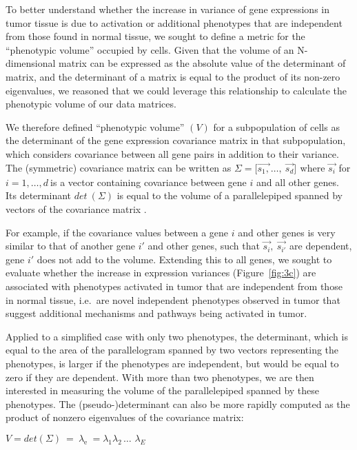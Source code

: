 To better understand whether the increase in variance of gene expressions in tumor tissue is due to activation or additional phenotypes that are independent from those found in normal tissue, we sought to define a metric for the ``phenotypic volume'' occupied by cells.
Given that the volume of an N-dimensional matrix can be expressed as the absolute value of the determinant of matrix, and the determinant of a matrix is equal to the product of its non-zero eigenvalues, we reasoned that we could leverage this relationship to calculate the phenotypic volume of our data matrices. %

We therefore defined ``phenotypic volume'' \((V)\) for a subpopulation of cells as the determinant of the gene expression covariance matrix in that subpopulation, which considers covariance between all gene pairs in addition to their variance.
The (symmetric) covariance matrix can be written as \(\Sigma = \lbrack{\overrightarrow{s_{1},}}_{}\ldots,\ \overrightarrow{s_{d}}\rbrack^{}\) where \(\overrightarrow{s_{i}}\) for \(i = 1,\ldots,d\ \)is a vector containing covariance between gene \(i\) and all other genes.
Its determinant \(det\ (\Sigma)\) is equal to the volume of a parallelepiped spanned by vectors of the covariance matrix \citep{Tao2005}.

For example, if the covariance values between a gene \(i\) and other genes is very similar to that of another gene \(i'\) and other genes, such that \(\overrightarrow{s_{i}},\ \overrightarrow{s_{i'}}\) are dependent, gene \(i'\) does not add to the volume.
Extending this to all genes, we sought to evaluate whether the increase in expression variances (Figure~\ref{fig:3c}) are associated with phenotypes activated in tumor that are independent from those in normal tissue, i.e.\ are novel independent phenotypes observed in tumor that suggest additional mechanisms and pathways being activated in tumor.

Applied to a simplified case with only two phenotypes, the determinant, which is equal to the area of the parallelogram spanned by two vectors representing the phenotypes, is larger if the phenotypes are independent, but would be equal to zero if they are dependent.
With more than two phenotypes, we are then interested in measuring the volume of the parallelepiped spanned by these phenotypes.
The (pseudo-)determinant can also be more rapidly computed as the product of nonzero eigenvalues of the covariance matrix:

\(V = det(\Sigma)\  = \ \lambda_{\text{e\ }} = \lambda_{1}\lambda_{2\ }\text{\ldots\ }\lambda_{E}\)

